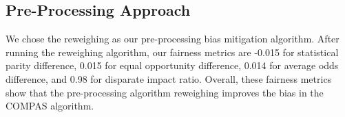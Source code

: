 \documentclass[water,article,submit,moreauthors,pdftex]{mdpi}
\begin{document}
\hypertarget{pre-processing-approach}{%
\subsection{Pre-Processing Approach}\label{pre-processing-approach}}

We chose the reweighing as our pre-processing bias mitigation algorithm.
After running the reweighing algorithm, our fairness metrics are -0.015
for statistical parity difference, 0.015 for equal opportunity
difference, 0.014 for average odds difference, and 0.98 for disparate
impact ratio. Overall, these fairness metrics show that the
pre-processing algorithm reweighing improves the bias in the COMPAS
algorithm.

%

\vspace{6pt}







\end{document}

